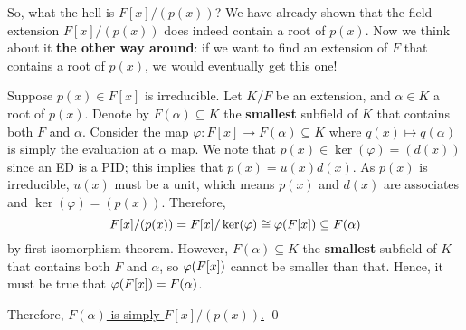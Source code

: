 \documentclass[12pt]{article}
\begin{document}
So, what the hell is $F[x]/(p(x))$? We have already shown that the field extension $F[x]/(p(x))$ does indeed contain a root of $p(x)$. Now we think about it \textbf{the other way around}: if we want to find an extension of $F$ that contains a root of $p(x)$, we would eventually get this one!

Suppose $p(x)\in F[x]$ is irreducible. Let $K/F$ be an extension, and $\alpha\in K$ a root of $p(x)$. Denote by $F(\alpha)\subseteq K$ the \textbf{smallest} subfield of $K$ that contains both $F$ and $\alpha$. Consider the map $\varphi : F[x]\to F(\alpha)\subseteq K$ where $q(x)\mapsto q(\alpha)$ is simply the evaluation at $\alpha$ map. We note that $p(x)\in \ker(\varphi) = (d(x))$ since an ED is a PID; this implies that $p(x)=u(x)d(x)$. As $p(x)$ is irreducible, $u(x)$ must be a unit, which means $p(x)$ and $d(x)$ are associates and $\ker(\varphi)=(p(x))$. Therefore, $$F[x]/(p(x))= F[x]/\ker(\varphi)\cong \varphi (F[x])\subseteq F(\alpha)$$ by first isomorphism theorem. However, $F(\alpha)\subseteq K$ the \textbf{smallest} subfield of $K$ that contains both $F$ and $\alpha$, so $\varphi (F[x])$ cannot be smaller than that. Hence, it must be true that $\varphi (F[x])=F(\alpha)$.

Therefore, \uline{$F(\alpha)$ is simply $F[x]/(p(x))$.} \qed
\end{document}
